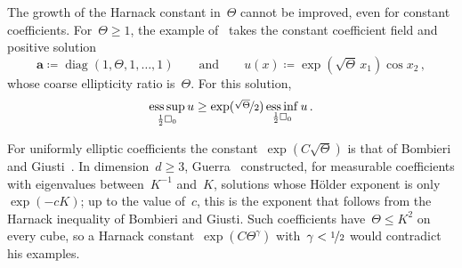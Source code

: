 \documentclass[11pt,letterpaper]{article}
\numberwithin{equation}{section}
\theoremstyle{definition}
\renewcommand{\a}{\mathbf{a}}
\newcommand{\nf}{\nicefrac}
\newcommand{\cu}{\square}
\DeclareMathOperator*{\esssup}{ess\,sup}
\DeclareMathOperator*{\essinf}{ess\,inf}
\begin{document}
The growth of the Harnack constant in~$\Theta$ cannot be improved, even for constant coefficients. For~$\Theta\geq1$, the example of~\cite{AADKM} takes the constant coefficient field and positive solution
\begin{equation*}
	\a\coloneqq\operatorname{diag}(1,\Theta,1,\ldots,1)\qquad\mbox{and}\qquad u(x)\coloneqq\exp(\sqrt\Theta\,x_1)\cos x_2\,,
\end{equation*}
whose coarse ellipticity ratio is~$\Theta$. For this solution,
\begin{equation*}
	\esssup_{\frac12\cu_0}u\geq\exp(\nf{\sqrt\Theta}2)\essinf_{\frac12\cu_0}u\,.
\end{equation*}

For uniformly elliptic coefficients the constant~$\exp(C\sqrt\Theta)$ is that of Bombieri and Giusti~\cite{Bombieri.Giusti}. In dimension~$d\geq3$, Guerra~\cite{Guerra} constructed, for measurable coefficients with eigenvalues between~$K^{-1}$ and~$K$, solutions whose H\"older exponent is only~$\exp(-cK)$; up to the value of~$c$, this is the exponent that follows from the Harnack inequality of Bombieri and Giusti. Such coefficients have~$\Theta\leq K^2$ on every cube, so a Harnack constant~$\exp(C\Theta^\gamma)$ with~$\gamma<\nf12$ would contradict his examples.
\end{document}
